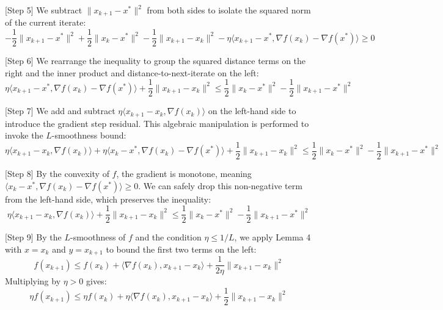 \documentclass{article}
\begin{document}
[Step 5] We subtract $\|x_{k+1} - x^*\|^2$ from both sides to isolate the squared norm of the current iterate:
\begin{equation}
    -\frac{1}{2} \|x_{k+1} - x^*\|^2 + \frac{1}{2} \|x_k - x^*\|^2 - \frac{1}{2} \|x_{k+1} - x_k\|^2 - \eta \langle x_{k+1} - x^*, \nabla f(x_k) - \nabla f(x^*) \rangle \geq 0
\end{equation}

[Step 6] We rearrange the inequality to group the squared distance terms on the right and the inner product and distance-to-next-iterate on the left:
\begin{equation}
    \eta \langle x_{k+1} - x^*, \nabla f(x_k) - \nabla f(x^*) \rangle + \frac{1}{2} \|x_{k+1} - x_k\|^2 \leq \frac{1}{2} \|x_k - x^*\|^2 - \frac{1}{2} \|x_{k+1} - x^*\|^2
\end{equation}

[Step 7] We add and subtract $\eta \langle x_{k+1} - x_k, \nabla f(x_k) \rangle$ on the left-hand side to introduce the gradient step residual. This algebraic manipulation is performed to invoke the $L$-smoothness bound:
\begin{equation}
    \eta \langle x_{k+1} - x_k, \nabla f(x_k) \rangle + \eta \langle x_k - x^*, \nabla f(x_k) - \nabla f(x^*) \rangle + \frac{1}{2} \|x_{k+1} - x_k\|^2 \leq \frac{1}{2} \|x_k - x^*\|^2 - \frac{1}{2} \|x_{k+1} - x^*\|^2
\end{equation}

[Step 8] By the convexity of $f$, the gradient is monotone, meaning $\langle x_k - x^*, \nabla f(x_k) - \nabla f(x^*) \rangle \geq 0$. We can safely drop this non-negative term from the left-hand side, which preserves the inequality:
\begin{equation}
    \eta \langle x_{k+1} - x_k, \nabla f(x_k) \rangle + \frac{1}{2} \|x_{k+1} - x_k\|^2 \leq \frac{1}{2} \|x_k - x^*\|^2 - \frac{1}{2} \|x_{k+1} - x^*\|^2
\end{equation}

[Step 9] By the $L$-smoothness of $f$ and the condition $\eta \leq 1/L$, we apply Lemma 4 with $x = x_k$ and $y = x_{k+1}$ to bound the first two terms on the left:
\begin{equation}
    f(x_{k+1}) \leq f(x_k) + \langle \nabla f(x_k), x_{k+1} - x_k \rangle + \frac{1}{2\eta} \|x_{k+1} - x_k\|^2
\end{equation}
Multiplying by $\eta > 0$ gives:
\begin{equation}
    \eta f(x_{k+1}) \leq \eta f(x_k) + \eta \langle \nabla f(x_k), x_{k+1} - x_k \rangle + \frac{1}{2} \|x_{k+1} - x_k\|^2
\end{equation}
\end{document}
